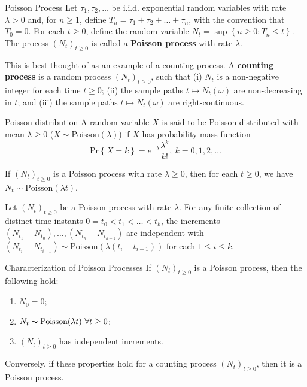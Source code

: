 \begin{defn}{Poisson Process}{}
Let \(\tau _1, \tau _2, \dots \) be i.i.d. exponential random variables with rate \(\lambda > 0\) and, for \(n\geq 1\), define \(T_{n}  = \tau _1 + \tau _2 + \dots + \tau _{n} \), with the convention that \(T_0 = 0\). For each \(t\geq 0\), define the random variable \(N_{t} = \sup \left\{ n \geq 0: T_{n} \leq t \right\} \). The process \((N_{t} )_{t\geq 0}\) is called a \textbf{Poisson process} with rate \(\lambda  \). 

This is best thought of as an example of a counting process. A \textbf{counting process} is a random process \((N_{t} )_{t\geq 0}\), such that (i) \(N_{t} \) is a non-negative integer for each time \(t \geq 0\); (ii) the sample paths \(t \mapsto N_{t} (\omega )\) are non-decreasing in \(t\); and (iii) the sample paths \(t \mapsto N_{t} (\omega )\) are right-continuous. 
\end{defn}

\begin{defn}{Poisson distribution}{}
A random variable \(X\) is said to be Poisson distributed with mean \(\lambda \geq 0\)  (\(X \sim \text{Poisson}(\lambda ) \)) if \(X\) has probability mass function
\[
    \mathrm{Pr} \left\{ X = k \right\}  = e^{-\lambda }\frac{\lambda ^k}{k!} , \ k = 0,1,2, \dots 
\]
\end{defn}

\begin{idea}{}{}
If \((N_{t} )_{t \geq 0}\) is a Poisson process with rate \(\lambda \geq 0\), then for each \(t \geq 0\), we have \(N_{t} \sim \text{Poisson}(\lambda t)\). 
\end{idea}

\begin{thrm}{}{}
Let \((N_{t} )_{t \geq 0}\) be a Poisson process with rate \(\lambda \). For any finite collection of distinct time instants \(0 = t_0 < t_1 <\dots < t_{k} \), the increments \((N_{t_1} - N_{t_0}), \dots , (N_{t_{k} } - N_{t_{k - 1} })\) are independent with \((N_{t_{i} } - N_{t_{i - 1} }  ) \sim \text{Poisson}(\lambda (t_{i} - t_{i - 1} ))\) for each \(1\leq i\leq k\). 
\end{thrm}

\begin{thrm}{Characterization of Poisson Processes}{}
If \((N_{t} )_{t \geq 0}\) is a Poisson process, then the following hold:
\begin{enumerate}
    \item \(N_0 = 0\);
    \item \(N_{t} \thicksim \text{Poisson} (\lambda t) \ \forall t \geq 0 \); 
    \item \((N_{t} )_{t \geq 0}\) has independent increments. 
\end{enumerate}
Conversely, if these properties hold for a counting process \((N_{t} )_{t \geq 0}\), then it is a Poisson process.
\end{thrm}

